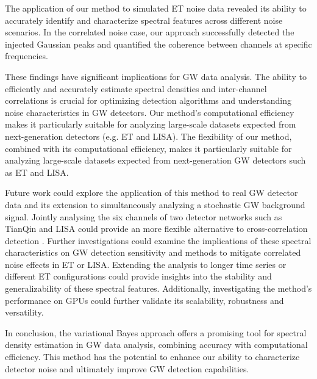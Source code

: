 \documentclass[%
 reprint,
 amsmath,amssymb,
 aps,
 nofootinbib,
]{revtex4-2}
\begin{document}
The application of our method to simulated ET noise data revealed its ability to accurately identify and characterize spectral features across different noise scenarios.
In the correlated noise case, our approach successfully detected the injected Gaussian peaks and quantified the coherence between channels at specific frequencies.


These findings have significant implications for GW data analysis. The ability to efficiently and accurately estimate spectral densities and inter-channel correlations is crucial for optimizing detection algorithms and understanding noise characteristics in GW detectors. Our method's computational efficiency makes it particularly suitable for analyzing large-scale datasets expected from next-generation detectors (e.g. ET and LISA). The flexibility of our method, combined with its computational efficiency, makes it particularly suitable for analyzing large-scale datasets expected from next-generation GW detectors such as ET and LISA.

Future work could explore the application of this method to real GW detector data and its extension to simultaneously analyzing a stochastic GW background signal. Jointly analysing the six channels of two detector networks such as TianQin and LISA could provide an more flexible alternative to cross-correlation detection  \cite{liang2024}.
Further investigations could examine the implications of these spectral characteristics on GW detection sensitivity and methods to mitigate correlated noise effects in ET or LISA. Extending the analysis to longer time series or different ET configurations could provide insights into the stability and generalizability of these spectral features.
Additionally, investigating the method's performance on GPUs could further validate its scalability, robustness and versatility.

In conclusion, the variational Bayes approach offers a promising tool for spectral density estimation in GW data analysis, combining accuracy with computational efficiency. This method has the potential to enhance our ability to characterize detector noise and ultimately improve GW detection capabilities.



\end{document}
